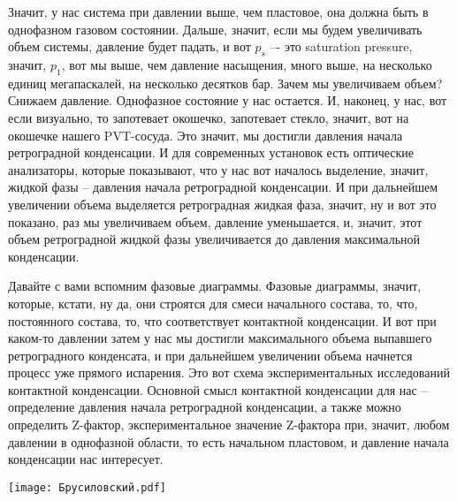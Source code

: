 \documentclass[main.tex]{subfiles}
\begin{document}
Значит, у нас система при давлении выше, чем пластовое, она должна быть в однофазном газовом состоянии.
Дальше, значит, если мы будем увеличивать объем системы, давление будет падать, и вот $p_s$ –- это saturation pressure, значит, $p_1$, вот мы выше, чем давление насыщения, много выше, на несколько единиц мегапаскалей, на несколько десятков бар.
Зачем мы увеличиваем объем? Снижаем давление.
Однофазное состояние у нас остается.
И, наконец, у нас, вот если визуально, то запотевает окошечко, запотевает стекло, значит, вот на окошечке нашего PVT-сосуда.
Это значит, мы достигли давления начала ретроградной конденсации.
И для современных установок есть оптические анализаторы, которые показывают, что у нас вот началось выделение, значит, жидкой фазы -- давления начала ретроградной конденсации.
И при дальнейшем увеличении объема выделяется ретроградная жидкая фаза, значит, ну и вот это показано, раз мы увеличиваем объем, давление уменьшается, и, значит, этот объем ретроградной жидкой фазы увеличивается до давления максимальной конденсации.

Давайте с вами вспомним фазовые диаграммы.
Фазовые диаграммы, значит, которые, кстати, ну да, они строятся для смеси начального состава, то, что, постоянного состава, то, что соответствует контактной конденсации.
И вот при каком-то давлении затем у нас мы достигли максимального объема выпавшего ретроградного конденсата, и при дальнейшем увеличении объема начнется процесс уже прямого испарения.
Это вот схема экспериментальных исследований контактной конденсации.
Основной смысл контактной конденсации для нас -- определение давления начала ретроградной конденсации, а также можно определить Z-фактор, экспериментальное значение Z-фактора при, значит, любом давлении в однофазной области, то есть начальном пластовом, и давление начала конденсации нас интересует.

\begin{center}
\texttt{[image: Брусиловский.pdf]}
\end{center}
\end{document}
